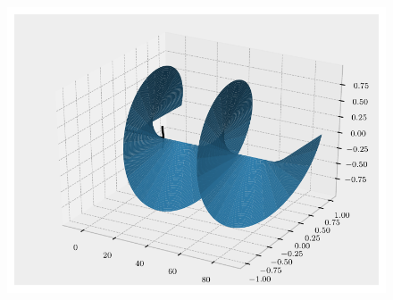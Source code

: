 \begin{frame}
    \begin{figure}[!]
        \centering
        \includegraphics{helicoid_test_case_3d2.pdf}
    \end{figure}
\end{frame}


